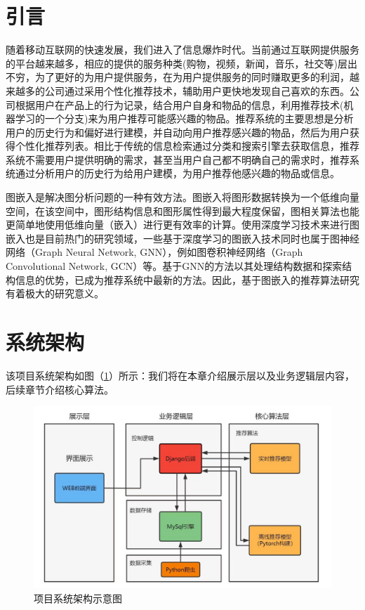 \documentclass{ctexart}
\begin{document}
\section{引言}
随着移动互联网的快速发展，我们进入了信息爆炸时代。当前通过互联网提供服务的平台越来越多，相应的提供的服务种类(购物，视频，新闻，音乐，社交等)层出不穷，为了更好的为用户提供服务，在为用户提供服务的同时赚取更多的利润，越来越多的公司通过采用个性化推荐技术，辅助用户更快地发现自己喜欢的东西。公司根据用户在产品上的行为记录，结合用户自身和物品的信息，利用推荐技术(机器学习的一个分支)来为用户推荐可能感兴趣的物品。推荐系统的主要思想是分析用户的历史行为和偏好进行建模，并自动向用户推荐感兴趣的物品，然后为用户获得个性化推荐列表。相比于传统的信息检索通过分类和搜索引擎去获取信息，推荐系统不需要用户提供明确的需求，甚至当用户自己都不明确自己的需求时，推荐系统通过分析用户的历史行为给用户建模，为用户推荐他感兴趣的物品或信息。

图嵌入是解决图分析问题的一种有效方法。图嵌入将图形数据转换为一个低维向量空间，在该空间中，图形结构信息和图形属性得到最大程度保留，图相关算法也能更简单地使用低维向量（嵌入）进行更有效率的计算。使用深度学习技术来进行图嵌入也是目前热门的研究领域，一些基于深度学习的图嵌入技术同时也属于图神经网络（Graph Neural Network, GNN），例如图卷积神经网络（Graph Convolutional Network, GCN）等。基于GNN的方法以其处理结构数据和探索结构信息的优势，已成为推荐系统中最新的方法。因此，基于图嵌入的推荐算法研究有着极大的研究意义。

\section{系统架构}
该项目系统架构如图（\ref{frame}）所示：我们将在本章介绍展示层以及业务逻辑层内容，后续章节介绍核心算法。
\begin {figure}[h]
\centering %
\includegraphics[width=\textwidth]{frame.jpg}
\caption{项目系统架构示意图} %
\label{frame}
\end {figure}
\end{document}

